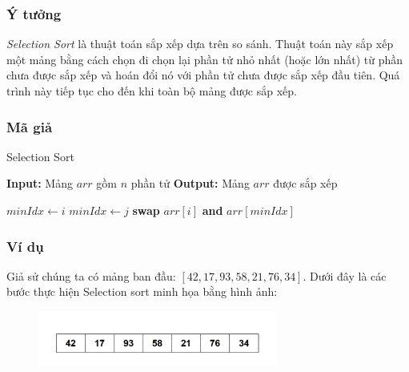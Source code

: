 \subsubsection{Ý tưởng}
\textit{Selection Sort} là thuật toán sắp xếp dựa trên so sánh. Thuật toán này sắp xếp một mảng bằng cách chọn đi chọn lại phần tử nhỏ nhất (hoặc lớn nhất) từ phần chưa được sắp xếp và hoán đổi nó với phần tử chưa được sắp xếp đầu tiên. Quá trình này tiếp tục cho đến khi toàn bộ mảng được sắp xếp. \cite{brown2021selection} \cite{smith2023selection}
\subsubsection{Mã giả}

\begin{algorithm}[H]
    \caption{Selection Sort}
    \begin{algorithmic}[1]
        \State \textbf{Input:} Mảng $arr$ gồm $n$ phần tử
        \State \textbf{Output:} Mảng $arr$ được sắp xếp
        
            \State $minIdx \gets i$
                    \State $minIdx \gets j$
                \EndIf
            \EndFor
                \State \textbf{swap} $arr[i]$ \textbf{and} $arr[minIdx]$
            \EndIf
        \EndFor
    \EndProcedure
    \end{algorithmic}
    
\end{algorithm}
\newpage
\subsubsection{Ví dụ}
Giả sử chúng ta có mảng ban đầu: $[42, 17, 93, 58, 21, 76, 34]$. Dưới đây là các bước thực hiện Selection sort minh họa bằng hình ảnh:

\begin{figure}[H]
    \centering
    \includegraphics[width=0.7\textwidth]{img/selection sort_suadoi/1.png}
    
\end{figure}

